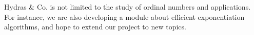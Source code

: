 \documentclass{easychair}
\newcommand{\Hydras}{Hydras \& Co.\xspace}
\begin{document}
 \Hydras is not limited to the study of ordinal numbers and applications.
 For instance, we are also developing 
a module about efficient exponentiation algorithms, and hope
to extend our project to new topics.




\label{sect:bib}

%
%
%

\end{document}
